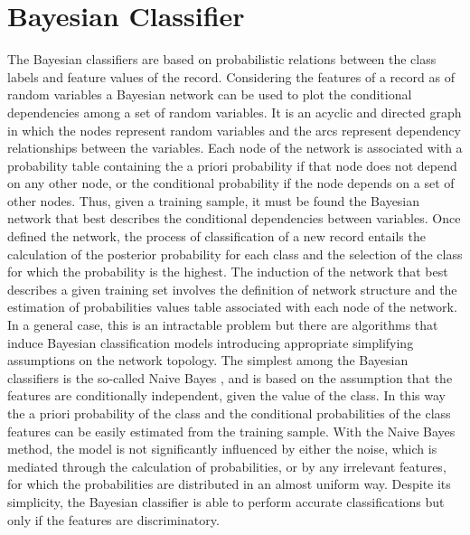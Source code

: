 \documentclass[final,a4paper,12pt,english]{UnicaPhdThesis3}
\begin{document}
\section{Bayesian Classifier} \label{NB}
The Bayesian classifiers are based on probabilistic relations between the class labels and feature values of the record. Considering the features of a record as of random variables a Bayesian network can be used to plot the conditional dependencies among a set of random variables. It is an acyclic and directed graph in which the nodes represent random variables and the arcs represent dependency relationships between the variables. Each node of the network is associated with a probability table containing the a priori probability if that node does not depend on any other node, or the conditional probability if the node depends on a set of other nodes. Thus, given a training sample, it must be found the Bayesian network that best describes the conditional dependencies between variables. Once defined the network, the process of classification of a new record entails the calculation of the posterior probability for each class and the selection of the class for which the probability is the highest. The induction of the network that best describes a given training set involves the definition of network structure and the estimation of probabilities values table associated with each node of the network. In a general case, this is an intractable problem but there are algorithms that induce Bayesian classification models introducing appropriate simplifying assumptions on the network topology. The simplest among the Bayesian classifiers is the so-called Naive Bayes  \cite{Duda}, \cite{Langley} and is based on the assumption that the features are conditionally independent, given the value of the class. In this way the a priori probability of the class and the conditional probabilities of the class features can be easily estimated from the training sample. With the Naive Bayes method, the model is not significantly influenced by either the noise, which is mediated through the calculation of probabilities, or by any irrelevant features, for which the probabilities are distributed in an almost uniform way. Despite its simplicity, the Bayesian classifier is able to perform accurate classifications but only if the features are discriminatory.
\end{document}
